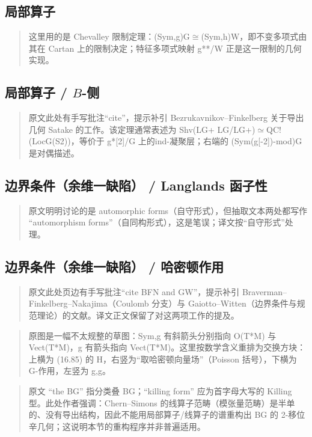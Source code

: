 \subsection*{局部算子}
\begin{quote}\small
这里用的是 Chevalley 限制定理：(Sym,g)G$\cong$(Sym,h)W，即不变多项式由其在 Cartan 上的限制决定；特征多项式映射 g**/W 正是这一限制的几何实现。
\end{quote}

\subsection*{局部算子 / $B$-侧}
\begin{quote}\small
原文此处有手写批注“cite”，提示补引 Bezrukavnikov--Finkelberg 关于导出几何 Satake 的工作。该定理通常表述为 Shv(LG+ LG/LG+)$\simeq$QC!(LocG(S2))，等价于 g*[2]/G 上的ind-凝聚层；右端的 (Sym(g[-2])-mod)G 是对偶描述。
\end{quote}

\subsection*{边界条件（余维一缺陷） / Langlands 函子性}
\begin{quote}\small
原文明明讨论的是 automorphic forms（自守形式），但抽取文本两处都写作 “automorphism forms”（自同构形式），这是笔误；译文按“自守形式”处理。
\end{quote}

\subsection*{边界条件（余维一缺陷） / 哈密顿作用}
\begin{quote}\small
原文此处页边有手写批注“cite BFN and GW”，提示补引 Braverman--Finkelberg--Nakajima（Coulomb 分支）与 Gaiotto--Witten（边界条件与规范理论）的文献。译文正文保留了对这两项工作的提及。
\end{quote}

\begin{quote}\small
原图是一幅不太规整的草图：Sym,g 有斜箭头分别指向 O(T*M) 与 Vect(T*M)，g 有箭头指向 Vect(T*M)。这里按数学含义重排为交换方块：上横为 (16.85) 的 H，右竖为“取哈密顿向量场”（Poisson 括号），下横为 G-作用，左竖为 g,g。
\end{quote}

\begin{quote}\small
原文 “the BG” 指分类叠 BG；“killing form” 应为首字母大写的 Killing 型。此处作者强调：Chern--Simons 的线算子范畴（模张量范畴）是半单的、没有导出结构，因此不能用局部算子/线算子的谱重构出 BG 的 2-移位辛几何；这说明本节的重构程序并非普遍适用。
\end{quote}


